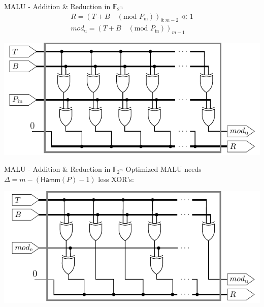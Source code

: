\documentclass[svgnames]{beamer}
\newenvironment{changemargin}[2]{%
\begin{list}{}{%
\setlength{\topsep}{0pt}%
\setlength{\leftmargin}{#1}%
\setlength{\rightmargin}{#2}%
\setlength{\listparindent}{\parindent}%
\setlength{\itemindent}{\parindent}%
\setlength{\parsep}{\parskip}%
}%
\item[]}{\end{list}}
\begin{document}
\begin{frame}{MALU - Addition \& Reduction in $\mathbb{F}_{2^m}$}
\\[-1em]
	\[\begin{gathered}
		R = \left(T + B \quad (\text{mod } P_{\text{in}}) \right)_{0:m-2} \ll 1 \\
		mod_{\text{u}} = \left(T + B \quad (\text{mod } P_{\text{in}}) \right)_{m - 1}
	\end{gathered}\]
	\begin{changemargin}{-2cm}{-2cm}
	\begin{center}\includegraphics[height=0.5\paperheight]{images/malu-basic}\end{center}
	\end{changemargin}
\end{frame}

\begin{frame}{MALU - Addition \& Reduction in $\mathbb{F}_{2^m}$}
	Optimized MALU needs $\Delta = m - \left( \textsf{Hamm}(P) - 1 \right)$ less XOR's:\\[1.7em]
	\begin{changemargin}{-2cm}{-2cm}
	\begin{center}\includegraphics[height=0.5\paperheight]{images/malu-optimized}\end{center}
	\end{changemargin}
\end{frame}
\end{document}
